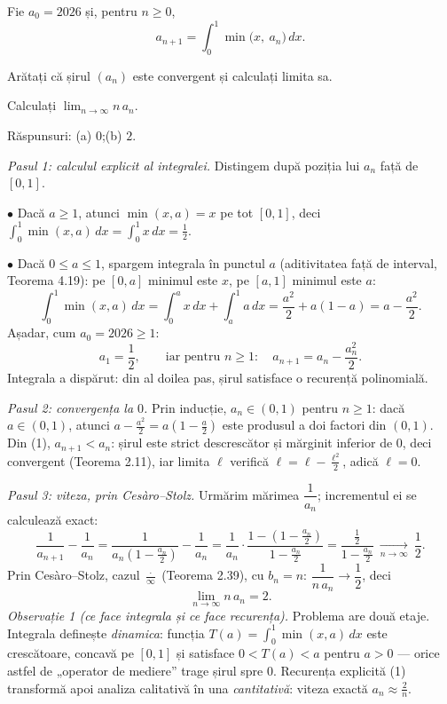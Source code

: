 Fie $a_{0}=2026$ și, pentru $n\ge0$,
\[ a_{n+1}=\int_{0}^{1}\min\bigl(x,\ a_{n}\bigr)\,dx . \]
\begin{parti}
  \item Arătați că șirul $(a_{n})$ este convergent și calculați limita sa.
  \item Calculați $\displaystyle\lim_{n\to\infty}n\,a_{n}$.
\end{parti}
\sol Răspunsuri: (a) $0$;\qquad (b) $2$.

\emph{Pasul 1: calculul explicit al integralei.} Distingem după poziția lui $a_{n}$ față de $[0,1]$.

$\bullet$ Dacă $a\ge1$, atunci $\min(x,a)=x$ pe tot $[0,1]$, deci $\displaystyle\int_{0}^{1}\min(x,a)\,dx=\int_{0}^{1}x\,dx=\frac12$.

$\bullet$ Dacă $0\le a\le1$, spargem integrala în punctul $a$ (aditivitatea față de interval, Teorema 4.19): pe $[0,a]$ minimul este $x$, pe $[a,1]$ minimul este $a$:
\[ \int_{0}^{1}\min(x,a)\,dx=\int_{0}^{a}x\,dx+\int_{a}^{1}a\,dx=\frac{a^{2}}{2}+a(1-a)=a-\frac{a^{2}}{2} . \]
Așadar, cum $a_{0}=2026\ge1$:
\[ a_{1}=\frac12,\qquad\text{iar pentru }n\ge1:\quad a_{n+1}=a_{n}-\frac{a_{n}^{2}}{2} . \tag{1} \]
Integrala a dispărut: din al doilea pas, șirul satisface o recurență polinomială.

\emph{Pasul 2: convergența la $0$.} Prin inducție, $a_{n}\in(0,1)$ pentru $n\ge1$: dacă $a\in(0,1)$, atunci $a-\frac{a^{2}}{2}=a\left(1-\frac a2\right)$ este produsul a doi factori din $(0,1)$. Din (1), $a_{n+1}<a_{n}$: șirul este strict descrescător și mărginit inferior de $0$, deci convergent (Teorema 2.11), iar limita $\ell$ verifică $\ell=\ell-\frac{\ell^{2}}{2}$, adică $\ell=0$.

\emph{Pasul 3: viteza, prin Cesàro--Stolz.} Urmărim mărimea $\dfrac{1}{a_{n}}$; incrementul ei se calculează exact:
\[ \frac{1}{a_{n+1}}-\frac{1}{a_{n}}=\frac{1}{a_{n}\left(1-\frac{a_{n}}{2}\right)}-\frac{1}{a_{n}}=\frac{1}{a_{n}}\cdot\frac{1-\left(1-\frac{a_{n}}{2}\right)}{1-\frac{a_{n}}{2}}=\frac{\frac12}{1-\frac{a_{n}}{2}}\ \xrightarrow[n\to\infty]{}\ \frac12 . \]
Prin Cesàro--Stolz, cazul $\frac{\cdot}{\infty}$ (Teorema 2.39), cu $b_{n}=n$: $\dfrac{1}{n\,a_{n}}\to\dfrac12$, deci
\[ \lim_{n\to\infty}n\,a_{n}=2 . \]
\emph{Observație 1 (ce face integrala și ce face recurența).} Problema are două etaje. Integrala definește \emph{dinamica}: funcția $T(a)=\int_{0}^{1}\min(x,a)\,dx$ este crescătoare, concavă pe $[0,1]$ și satisface $0<T(a)<a$ pentru $a>0$ --- orice astfel de „operator de mediere'' trage șirul spre $0$. Recurența explicită (1) transformă apoi analiza calitativă în una \emph{cantitativă}: viteza exactă $a_{n}\approx\frac2n$.

